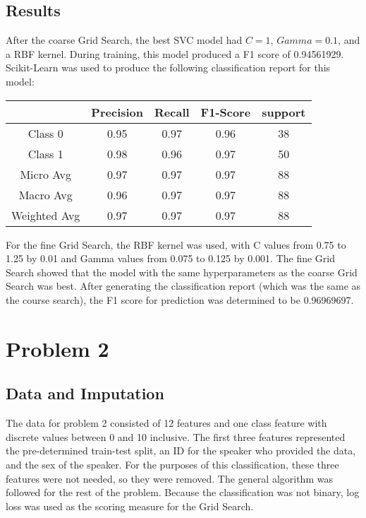 \documentclass[12pt]{article}
\begin{document}
    \subsection{Results}
    After the coarse Grid Search, the best SVC model had $C = 1$, $Gamma = 0.1$, and a RBF kernel. During training, this model produced a F1 score of 0.94561929. Scikit-Learn was used to produce the following classification report for this model:
    \begin{center}
    	\begin{tabular}{| c | c | c | c | c |}
    		\hline
    		& Precision & Recall & F1-Score & support \\ \hline
    		Class 0 & 0.95 & 0.97 & 0.96 & 38 \\ \hline
    		Class 1 & 0.98 & 0.96 & 0.97 & 50 \\ \hline
    		Micro Avg & 0.97 & 0.97 & 0.97 & 88 \\ \hline
    		Macro Avg & 0.96 & 0.97 & 0.97 & 88 \\ \hline
    		Weighted Avg & 0.97 & 0.97 & 0.97 & 88 \\ \hline
    	\end{tabular}
    \end{center}
    For the fine Grid Search, the RBF kernel was used, with C values from 0.75 to 1.25 by 0.01 and Gamma values from 0.075 to 0.125 by 0.001. The fine Grid Search showed that the model with the same hyperparameters as the coarse Grid Search was best. After generating the classification report (which was the same as the course search), the F1 score for prediction was determined to be 0.96969697.
    
    \section{Problem 2}
    
    \subsection{Data and Imputation}
    The data for problem 2 consisted of 12 features and one class feature with discrete values between 0 and 10 inclusive. The first three features represented the pre-determined train-test split, an ID for the speaker who provided the data, and the sex of the speaker. For the purposes of this classification, these three features were not needed, so they were removed. The general algorithm was followed for the rest of the problem. Because the classification was not binary, log loss was used as the scoring measure for the Grid Search.
    
\end{document}
